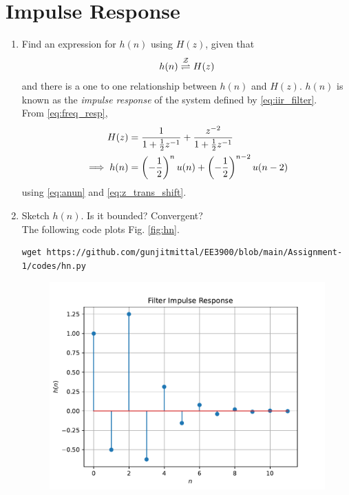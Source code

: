 \documentclass[journal,12pt,twocolumn]{IEEEtran}
\renewcommand\thesection{\arabic{section}}
\begin{document}
\section{Impulse Response}
\begin{enumerate}[label=\thesection.\arabic*]
\item \label{prob:impulse_resp}
Find an expression for $h(n)$ using $H(z)$, given that 
\begin{equation}
\label{eq:impulse_resp}
h(n) \overset{\mathcal{Z}}{ \rightleftharpoons} H(z)
\end{equation}
and there is a one to one relationship between $h(n)$ and $H(z)$. $h(n)$ is known as the {\em impulse response} of the
system defined by \eqref{eq:iir_filter}.
\\
\solution From \eqref{eq:freq_resp},
\begin{align}
H(z) &= \frac{1}{1 + \frac{1}{2}z^{-1}} + \frac{ z^{-2}}{1 + \frac{1}{2}z^{-1}}
\\
\implies h(n) &= \left(-\frac{1}{2}\right)^{n}u(n) + \left(-\frac{1}{2}\right)^{n-2}u(n-2)
\end{align}
using \eqref{eq:anun} and \eqref{eq:z_trans_shift}.
\item Sketch $h(n)$. Is it bounded? Convergent? 
\\
\solution The following code plots Fig. \ref{fig:hn}.
\begin{lstlisting}
wget https://github.com/gunjitmittal/EE3900/blob/main/Assignment-1/codes/hn.py
\end{lstlisting}
\begin{figure}[!ht]
\centering
\includegraphics[width=\columnwidth]{./figs/hn}

\end{figure}
\end{enumerate}
\end{document}
